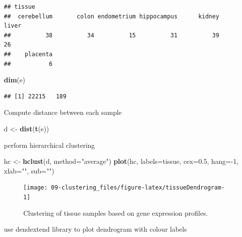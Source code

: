 \documentclass[]{book}
\newenvironment{Shaded}{\begin{snugshade}}{\end{snugshade}}
\newcommand{\KeywordTok}[1]{\textcolor[rgb]{0.13,0.29,0.53}{\textbf{{#1}}}}
\newcommand{\DataTypeTok}[1]{\textcolor[rgb]{0.13,0.29,0.53}{{#1}}}
\newcommand{\DecValTok}[1]{\textcolor[rgb]{0.00,0.00,0.81}{{#1}}}
\newcommand{\FloatTok}[1]{\textcolor[rgb]{0.00,0.00,0.81}{{#1}}}
\newcommand{\StringTok}[1]{\textcolor[rgb]{0.31,0.60,0.02}{{#1}}}
\newcommand{\NormalTok}[1]{{#1}}
\theoremstyle{definition}
\theoremstyle{definition}
\theoremstyle{definition}
\theoremstyle{remark}
\begin{document}
\begin{verbatim}
## tissue
##  cerebellum       colon endometrium hippocampus      kidney       liver 
##          38          34          15          31          39          26 
##    placenta 
##           6
\end{verbatim}

\begin{Shaded}
\begin{Highlighting}[]
\KeywordTok{dim}\NormalTok{(e)}
\end{Highlighting}
\end{Shaded}

\begin{verbatim}
## [1] 22215   189
\end{verbatim}

Compute distance between each sample

\begin{Shaded}
\begin{Highlighting}[]
\NormalTok{d <-}\StringTok{ }\KeywordTok{dist}\NormalTok{(}\KeywordTok{t}\NormalTok{(e))}
\end{Highlighting}
\end{Shaded}

perform hierarchical clustering

\begin{Shaded}
\begin{Highlighting}[]
\NormalTok{hc <-}\StringTok{ }\KeywordTok{hclust}\NormalTok{(d, }\DataTypeTok{method=}\StringTok{"average"}\NormalTok{)}
\KeywordTok{plot}\NormalTok{(hc, }\DataTypeTok{labels=}\NormalTok{tissue, }\DataTypeTok{cex=}\FloatTok{0.5}\NormalTok{, }\DataTypeTok{hang=}\NormalTok{-}\DecValTok{1}\NormalTok{, }\DataTypeTok{xlab=}\StringTok{""}\NormalTok{, }\DataTypeTok{sub=}\StringTok{""}\NormalTok{)}
\end{Highlighting}
\end{Shaded}

\begin{figure}

{\centering \texttt{[image: 09-clustering\_files/figure-latex/tissueDendrogram-1]} 

}

\caption{Clustering of tissue samples based on gene expression profiles. }\label{fig:tissueDendrogram}
\end{figure}

use dendextend library to plot dendrogram with colour labels
\end{document}
